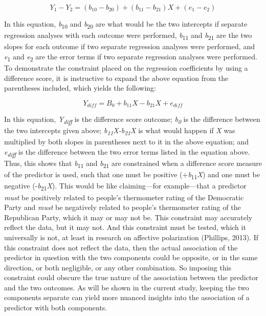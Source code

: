 \documentclass[authordate, meta, issue]{jote-new-article}
\begin{document}
	\begin{equation}
		Y_1-Y_2=(b_{10}-b_{20})+(b_{11}-b_{21})X+(e_1-e_2)
	\end{equation}



	In this equation, \emph{b}\textsubscript{10} and \emph{b}\textsubscript{20} are what would be the two intercepts if separate regression analyses with each outcome were performed, \emph{b}\textsubscript{11} and \emph{b}\textsubscript{21} are the two slopes for each outcome if two separate regression analyses were performed, and \emph{e}\textsubscript{1} and \emph{e}\textsubscript{2} are the error terms if two separate regression analyses were performed. To demonstrate the constraint placed on the regression coefficients by using a difference score, it is instructive to expand the above equation from the parentheses included, which yields the following:



	\begin{equation}
		Y_{diff}=B_0+b_{11}X-b_{21}X+e_{diff}
	\end{equation}



	In this equation, \emph{Y\textsubscript{diff}} is the difference score outcome; \emph{b\textsubscript{0}} is the difference between the two intercepts given above; \emph{b\textsubscript{11}X-b\textsubscript{21}X} is what would happen if \emph{X} was multiplied by both slopes in parentheses next to it in the above equation; and \emph{e\textsubscript{diff}} is the difference between the two error terms listed in the equation above. Thus, this shows that \emph{b}\textsubscript{11} and \emph{b}\textsubscript{21} are constrained when a difference score measure of the predictor is used, such that one must be positive (+\emph{b}\textsubscript{11}\emph{X}) and one must be negative (-\emph{b}\textsubscript{21}\emph{X}). This would be like claiming—for example—that a predictor \emph{must} be positively related to people's thermometer rating of the Democratic Party and \emph{must }be negatively related to people's thermometer rating of the Republican Party, which it may or may not be. This constraint may accurately reflect the data, but it may not. And this constraint must be tested, which it universally is not, at least in research on affective polarization (Phillips, 2013). If this constraint does not reflect the data, then the actual association of the predictor in question with the two components could be opposite, or in the same direction, or both negligible, or any other combination. So imposing this constraint could obscure the true nature of the association between the predictor and the two outcomes. As will be shown in the current study, keeping the two components separate can yield more nuanced insights into the association of a predictor with both components.
\end{document}
